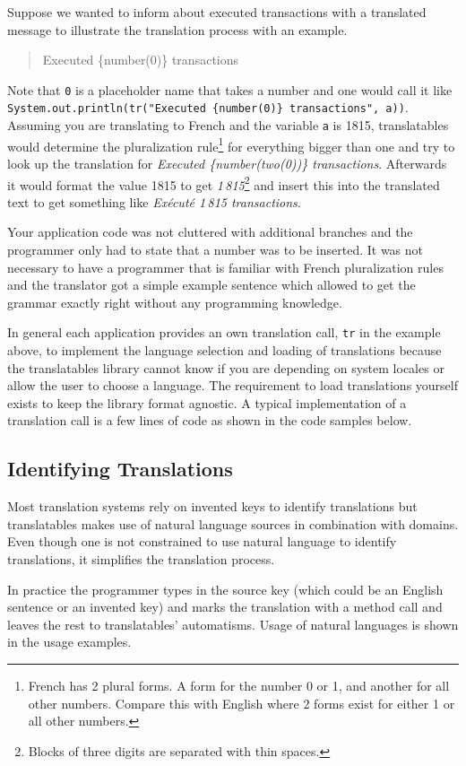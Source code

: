 \documentclass[a4paper,11pt,twoside]{report}
\begin{document}
Suppose we wanted to inform about executed transactions with a translated message to illustrate the translation process with an example.
\begin{quotation}
Executed \{number(0)\} transactions
\end{quotation}
Note that \verb|0| is a placeholder name that takes a number and one would call it like \lstinline$System.out.println(tr("Executed {number(0)} transactions", a))$. Assuming you are translating to French and the variable \verb|a| is 1815, translatables would determine the pluralization rule\footnote{French has 2 plural forms. A form for the number 0 or 1, and another for all other numbers. Compare this with English where 2 forms exist for either 1 or all other numbers.} for everything bigger than one and try to look up the translation for \textit{Executed \{number(two(0))\} transactions}. Afterwards it would format the value 1815 to get \textit{1\,815}\footnote{Blocks of three digits are separated with thin spaces.} and insert this into the translated text to get something like \textit{Exécuté 1\,815 transactions}.

Your application code was not cluttered with additional branches and the programmer only had to state that a number was to be inserted. It was not necessary to have a programmer that is familiar with French pluralization rules and the translator got a simple example sentence which allowed to get the grammar exactly right without any programming knowledge.

In general each application provides an own translation call, \lstinline$tr$ in the example above, to implement the language selection and loading of translations because the translatables library cannot know if you are depending on system locales or allow the user to choose a language. The requirement to load translations yourself exists to keep the library format agnostic. A typical implementation of a translation call is a few lines of code as shown in the code samples below.

\subsection{Identifying Translations}
Most translation systems rely on invented keys to identify translations but translatables makes use of natural language sources in combination with domains. Even though one is not constrained to use natural language to identify translations, it simplifies the translation process.

In practice the programmer types in the source key (which could be an English sentence or an invented key) and marks the translation with a method call and leaves the rest to translatables' automatisms. Usage of natural languages is shown in the usage examples.
\end{document}
